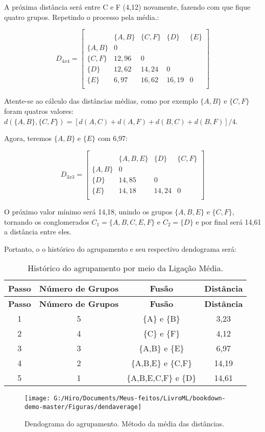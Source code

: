 \documentclass[
  openany]{book}
\begin{document}
A próxima distância será entre C e F (4,12) novamente, fazendo com que fique quatro grupos. Repetindo o processo pela média.:

\[D_{4x4}=\begin{bmatrix}\\
 &\{A,B\}& \{C,F\}&\{D\}&\{E\} \\
 \{A,B\}&0&&\\
 \{C,F\} & 12,96&0&&\\
 \{D\}& 12,62& 14,24&0&\\
 \{E\}& 6,97& 16,62& 16,19&0\\
\end{bmatrix}\]

Atente-se ao cálculo das distâncias médias, como por exemplo \(\{A,B\}\) e \(\{C,F\}\) foram quatros valores: \(d(\{A,B\},\{C,F\})=[d(A,C)+d(A,F)+d(B,C)+d(B,F)]/4\).

Agora, teremos \(\{A,B\}\) e \(\{E\}\) com 6,97:

\[D_{3x3}=\begin{bmatrix}\\
 &\{A,B,E\}& \{D\}&\{C,F\} \\
 \{A,B\}&0&\\
 \{D\} & 14,85&0&\\
 \{E\}& 14,18& 14,24&0\\
\end{bmatrix}\]

O próximo valor mínimo será 14,18, unindo os grupos \(\{A,B,E\}\) e \(\{C,F\}\), tornando os conglomerados \(C_1=\{A,B,C,E,F\}\) e \(C_2=\{D\}\) e por final será 14,61 a distância entre eles.

Portanto, o o histórico do agrupamento e seu respectivo dendograma será:

\begin{longtable}[]{@{}cccc@{}}
\caption{\label{tab:ligmedia} Histórico do agrupamento por meio da Ligação Média.}\tabularnewline
\toprule
\textbf{Passo} & \textbf{Número de Grupos} & \textbf{Fusão} & \textbf{Distância}\tabularnewline
\midrule
\endfirsthead
\toprule
\textbf{Passo} & \textbf{Número de Grupos} & \textbf{Fusão} & \textbf{Distância}\tabularnewline
\midrule
\endhead
1 & 5 & \{A\} e \{B\} & 3,23\tabularnewline
2 & 4 & \{C\} e \{F\} & 4,12\tabularnewline
3 & 3 & \{A,B\} e \{E\} & 6,97\tabularnewline
4 & 2 & \{A,B,E\} e \{C,F\} & 14,19\tabularnewline
5 & 1 & \{A,B,E,C,F\} e \{D\} & 14,61\tabularnewline
\bottomrule
\end{longtable}

\begin{figure}

{\centering \texttt{[image: G:/Hiro/Documents/Meus-feitos/LivroML/bookdown-demo-master/Figuras/dendaverage]} 

}

\caption{Dendograma do agrupamento. Método da média das distâncias.}\label{fig:dendaverage}
\end{figure}
\end{document}
